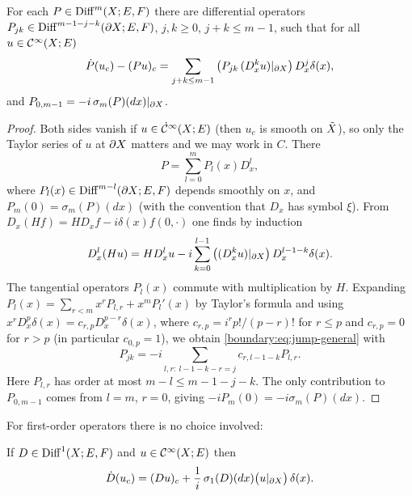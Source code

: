 \begin{proposition}\label{boundary:prop:jump}
For each $P\in\operatorname{Diff}^{m}(X;E,F)$ there are differential operators $P_{jk}\in
\operatorname{Diff}^{m-1-j-k}(\partial X;E,F)$, $j,k\ge0$, $j+k\le m-1$, such that for all $u\in\mathcal{C}^\infty(X;E)$
\begin{equation}\label{boundary:eq:jump-general}
\dot P(u_c)-(Pu)_c=\sum_{j+k\le m-1}\big(P_{jk}\,(D_x^ku)|_{\partial X}\big)\,D_x^j\delta(x),
\end{equation}
and $P_{0,m-1}=-i\,\sigma_m(P)(dx)|_{\partial X}$.
\end{proposition}
\begin{proof}
Both sides vanish if $u\in\dot{\mathcal{C}}^\infty(X;E)$ (then $u_c$ is smooth on $\tilde{X}$), so only the
Taylor series of $u$ at $\partial X$ matters and we may work in $C$. There
\begin{equation*}
P=\sum_{l=0}^mP_l(x)D_x^l,
\end{equation*}
where $P_l(x)\in\operatorname{Diff}^{m-l}(\partial X;E,F)$ depends smoothly on $x$, and
$P_m(0)=\sigma_m(P)(dx)$ (with the convention that $D_x$ has symbol $\xi$). From
$D_x(Hf)=HD_xf-i\delta(x)f(0,\cdot)$ one finds by induction
\begin{equation*}
D_x^l(Hu)=HD_x^lu-i\sum_{k=0}^{l-1}\big((D_x^ku)|_{\partial X}\big)\,D_x^{l-1-k}\delta(x).
\end{equation*}
The tangential operators $P_l(x)$ commute with multiplication by $H$. Expanding
$P_l(x)=\sum_{r<m}x^rP_{l,r}+x^mP_l'(x)$ by Taylor's formula and using $x^rD^p_x\delta
(x)=c_{r,p}D_x^{p-r}\delta(x)$, where $c_{r,p}=i^rp!/(p-r)!$ for $r\le p$ and
$c_{r,p}=0$ for $r>p$ (in particular $c_{0,p}=1$), we obtain
\eqref{boundary:eq:jump-general} with
\begin{equation*}
P_{jk}=-i\sum_{l,r:\ l-1-k-r=j}c_{r,l-1-k}P_{l,r}.
\end{equation*}
Here $P_{l,r}$ has order at most $m-l\le m-1-j-k$. The only contribution to
$P_{0,m-1}$ comes from $l=m$, $r=0$, giving $-iP_m(0)=-i\sigma_m(P)(dx)$.
\end{proof}

For first-order operators there is no choice involved:

\begin{corollary}\label{boundary:cor:jump1}
If $D\in\operatorname{Diff}^{1}(X;E,F)$ and $u\in\mathcal{C}^\infty(X;E)$ then
\begin{equation}\label{boundary:eq:jump}
\dot D(u_c)=(Du)_c+\frac1i\,\sigma_1(D)(dx)\big(u|_{\partial X}\big)\,\delta(x).
\end{equation}
\end{corollary}

